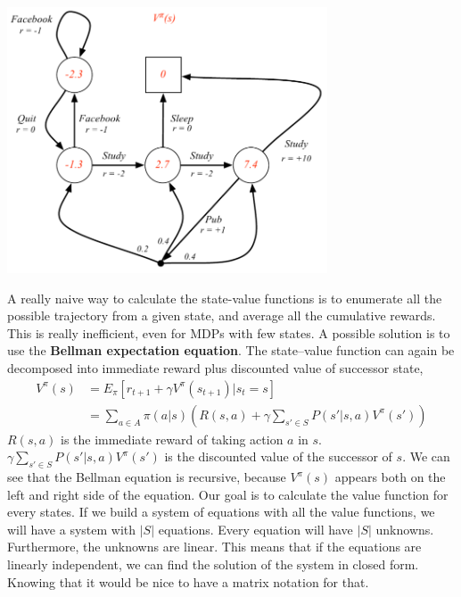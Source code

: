 \documentclass[../main.tex]{subfiles}
\begin{document}
\begin{center}
    \includegraphics[width=95mm]{images/MDP_ValueFunction.PNG}
\end{center}
A really naive way to calculate the state-value functions is to enumerate all the possible trajectory from a given state, and average all the cumulative rewards. This is really inefficient, even for MDPs with few states. A possible solution is to use the \textbf{Bellman expectation equation}. The state–value function can again be decomposed into immediate reward plus discounted value of successor state,
\begin{align*}
    V^{\pi}(s) & = E_{\pi}[r_{t+1} + \gamma V^{\pi}(s_{t+1})|s_t=s]                            \\
               & = \sum_{a\in A} \pi(a|s)(R(s,a) + \gamma \sum_{s' \in S}P(s'|s,a)V^{\pi}(s'))
\end{align*}
$R(s,a)$ is the immediate reward of taking action $a$ in $s$. $\gamma \sum_{s' \in S} P(s'|s,a)V^{\pi}(s')$ is the discounted value of the successor of $s$.
We can see that the Bellman equation is recursive, because $V^{\pi}(s)$ appears both on the left and right side of the equation\footnotemark.
Our goal is to calculate the value function for every states. If we build a system of equations with all the value functions, we will have a system with $|S|$ equations. Every equation will have $|S|$ unknowns. Furthermore, the unknowns are linear. This means that if the equations are linearly independent, we can find the solution of the system in closed form. Knowing that it would be nice to have a matrix notation for that.
\end{document}

